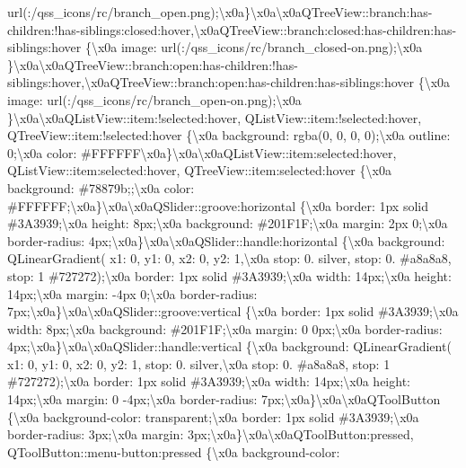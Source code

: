 \begin{DoxyCompactItemize}
url(\+:/qss\+\_\+icons/rc/branch\+\_\+open.\+png);\textbackslash{}x0a\}\textbackslash{}x0a\textbackslash{}x0a\+Q\+Tree\+View\+::branch\+:has-\/children\+:!has-\/siblings\+:closed\+:hover,\textbackslash{}x0a\+Q\+Tree\+View\+::branch\+:closed\+:has-\/children\+:has-\/siblings\+:hover \{\textbackslash{}x0a image\+: url(\+:/qss\+\_\+icons/rc/branch\+\_\+closed-\/on.\+png);\textbackslash{}x0a \}\textbackslash{}x0a\textbackslash{}x0a\+Q\+Tree\+View\+::branch\+:open\+:has-\/children\+:!has-\/siblings\+:hover,\textbackslash{}x0a\+Q\+Tree\+View\+::branch\+:open\+:has-\/children\+:has-\/siblings\+:hover \{\textbackslash{}x0a image\+: url(\+:/qss\+\_\+icons/rc/branch\+\_\+open-\/on.\+png);\textbackslash{}x0a \}\textbackslash{}x0a\textbackslash{}x0a\+Q\+List\+View\+::item\+:!selected\+:hover, Q\+List\+View\+::item\+:!selected\+:hover, Q\+Tree\+View\+::item\+:!selected\+:hover \{\textbackslash{}x0a background\+: rgba(0, 0, 0, 0);\textbackslash{}x0a outline\+: 0;\textbackslash{}x0a color\+: \#\+F\+F\+F\+F\+F\+F\textbackslash{}x0a\}\textbackslash{}x0a\textbackslash{}x0a\+Q\+List\+View\+::item\+:selected\+:hover, Q\+List\+View\+::item\+:selected\+:hover, Q\+Tree\+View\+::item\+:selected\+:hover \{\textbackslash{}x0a background\+: \#78879b;;\textbackslash{}x0a color\+: \#\+F\+F\+F\+F\+F\+F;\textbackslash{}x0a\}\textbackslash{}x0a\textbackslash{}x0a\+Q\+Slider\+::groove\+:horizontal \{\textbackslash{}x0a border\+: 1px solid \#3\+A3939;\textbackslash{}x0a height\+: 8px;\textbackslash{}x0a background\+: \#201\+F1\+F;\textbackslash{}x0a margin\+: 2px 0;\textbackslash{}x0a border-\/radius\+: 4px;\textbackslash{}x0a\}\textbackslash{}x0a\textbackslash{}x0a\+Q\+Slider\+::handle\+:horizontal \{\textbackslash{}x0a background\+: Q\+Linear\+Gradient( x1\+: 0, y1\+: 0, x2\+: 0, y2\+: 1,\textbackslash{}x0a stop\+: 0. silver, stop\+: 0. \#a8a8a8, stop\+: 1 \#727272);\textbackslash{}x0a border\+: 1px solid \#3\+A3939;\textbackslash{}x0a width\+: 14px;\textbackslash{}x0a height\+: 14px;\textbackslash{}x0a margin\+: -\/4px 0;\textbackslash{}x0a border-\/radius\+: 7px;\textbackslash{}x0a\}\textbackslash{}x0a\textbackslash{}x0a\+Q\+Slider\+::groove\+:vertical \{\textbackslash{}x0a border\+: 1px solid \#3\+A3939;\textbackslash{}x0a width\+: 8px;\textbackslash{}x0a background\+: \#201\+F1\+F;\textbackslash{}x0a margin\+: 0 0px;\textbackslash{}x0a border-\/radius\+: 4px;\textbackslash{}x0a\}\textbackslash{}x0a\textbackslash{}x0a\+Q\+Slider\+::handle\+:vertical \{\textbackslash{}x0a background\+: Q\+Linear\+Gradient( x1\+: 0, y1\+: 0, x2\+: 0, y2\+: 1, stop\+: 0. silver,\textbackslash{}x0a stop\+: 0. \#a8a8a8, stop\+: 1 \#727272);\textbackslash{}x0a border\+: 1px solid \#3\+A3939;\textbackslash{}x0a width\+: 14px;\textbackslash{}x0a height\+: 14px;\textbackslash{}x0a margin\+: 0 -\/4px;\textbackslash{}x0a border-\/radius\+: 7px;\textbackslash{}x0a\}\textbackslash{}x0a\textbackslash{}x0a\+Q\+Tool\+Button \{\textbackslash{}x0a background-\/color\+: transparent;\textbackslash{}x0a border\+: 1px solid \#3\+A3939;\textbackslash{}x0a border-\/radius\+: 3px;\textbackslash{}x0a margin\+: 3px;\textbackslash{}x0a\}\textbackslash{}x0a\textbackslash{}x0a\+Q\+Tool\+Button\+:pressed, Q\+Tool\+Button\+::menu-\/button\+:pressed \{\textbackslash{}x0a background-\/color\+: 
\end{DoxyCompactItemize}
